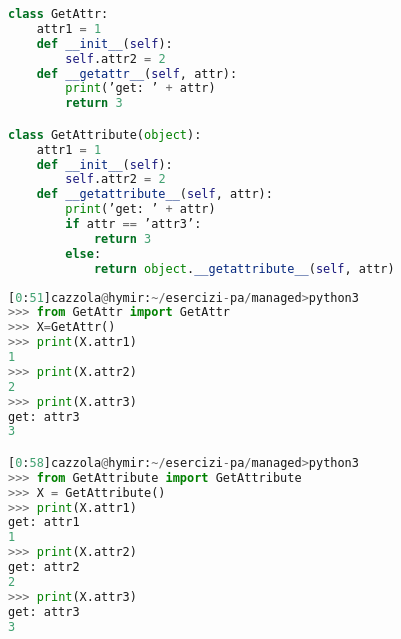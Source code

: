 \begin{lstlisting}[language=Python]
class GetAttr:
	attr1 = 1
	def __init__(self):
		self.attr2 = 2
	def __getattr__(self, attr):
		print(’get: ’ + attr)
		return 3

class GetAttribute(object):
	attr1 = 1
	def __init__(self):
		self.attr2 = 2
	def __getattribute__(self, attr):
		print(’get: ’ + attr)
		if attr == ’attr3’:
			return 3
		else:
			return object.__getattribute__(self, attr)
\end{lstlisting}

\begin{lstlisting}[language=Python]
[0:51]cazzola@hymir:~/esercizi-pa/managed>python3
>>> from GetAttr import GetAttr
>>> X=GetAttr()
>>> print(X.attr1)
1
>>> print(X.attr2)
2
>>> print(X.attr3)
get: attr3
3

[0:58]cazzola@hymir:~/esercizi-pa/managed>python3
>>> from GetAttribute import GetAttribute
>>> X = GetAttribute()
>>> print(X.attr1)
get: attr1
1
>>> print(X.attr2)
get: attr2
2
>>> print(X.attr3)
get: attr3
3
\end{lstlisting}
